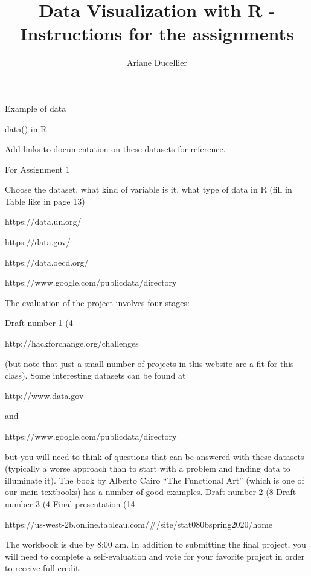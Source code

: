 \documentclass{beamer}
\title[Instructions for the assignments]{Data Visualization with R - Instructions for the assignments}
\author{Ariane Ducellier}
\begin{document}
	\begin{frame}
		\titlepage
	\end{frame}

	\begin{frame}


Example of data

data() in R

Add links to documentation on these datasets for reference.



For Assignment 1

Choose the dataset, what kind of variable is it, what type of data in R (fill in Table like in page 13)

https://data.un.org/

https://data.gov/

https://data.oecd.org/

https://www.google.com/publicdata/directory

The evaluation of the project involves four stages:

Draft number 1 (4%

 http://hackforchange.org/challenges

(but note that just a small number of projects in this website are a fit for this class).  Some interesting datasets can be found at 

http://www.data.gov 

and

https://www.google.com/publicdata/directory

but you will need to think of questions that can be answered with these datasets (typically a worse approach than to start with a problem and finding data to illuminate it).   The book by Alberto Cairo “The Functional Art” (which is one of our main textbooks) has a number of good examples. 
Draft number 2 (8%
Draft number 3 (4%
Final presentation (14%

https://us-west-2b.online.tableau.com/#/site/stat080bspring2020/home

The workbook is due by 8:00 am. In addition to submitting the final project, you will need to complete a self-evaluation and vote for your favorite project in order to receive full credit.

	\end{frame}
\end{document}
